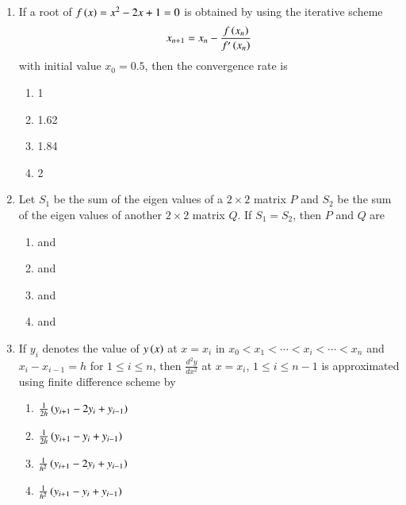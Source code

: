 \documentclass[journal]{IEEEtran}
\begin{document}
\begin{enumerate}
\begin{enumerate}
\end{enumerate}
\item If a root of $f\left(x\right) = x^2 - 2x + 1 = 0$ is obtained by using the iterative scheme 
\begin{align*}
    x_{n+1} = x_n - \frac{f\left(x_n\right)}{f'\left(x_n\right)}
\end{align*} with initial value $x_0 = 0.5$, then the convergence rate is
\begin{enumerate}
    \item 1
    \item 1.62
    \item 1.84
    \item 2 \\
\end{enumerate}
\item Let $S_1$ be the sum of the eigen values of a $2 \times 2$ matrix $P$ and $S_2$ be the sum of the eigen values of another $2 \times 2$ matrix $Q$. If $S_1 = S_2$, then $P$ and $Q$ are
\begin{enumerate}
    \item {} and 
    \item {} and 
    \item {} and 
    \item {} and  \\
\end{enumerate}
\item If $y_i$ denotes the value of $y\left(x\right)$ at $x = x_i$ in $x_0 < x_1 < \cdots < x_i < \cdots < x_n$ and $x_i - x_{i-1} = h$ for $1 \leq i \leq n$, then $\frac{d^2y}{dx^2}$ at $x = x_i$, $1 \leq i \leq n-1$ is approximated using finite difference scheme by 
\begin{enumerate}
    \item $\frac{1}{2h}\left(y_{i+1} - 2y_i + y_{i-1}\right)$
    \item $\frac{1}{2h}\left(y_{i+1} - y_i + y_{i-1}\right)$
    \item $\frac{1}{h^2}\left(y_{i+1} - 2y_i + y_{i-1}\right)$
    \item $\frac{1}{h^2}\left(y_{i+1} - y_i + y_{i-1}\right)$ \\
\end{enumerate}
			 \end{enumerate}
			 
\end{document}
